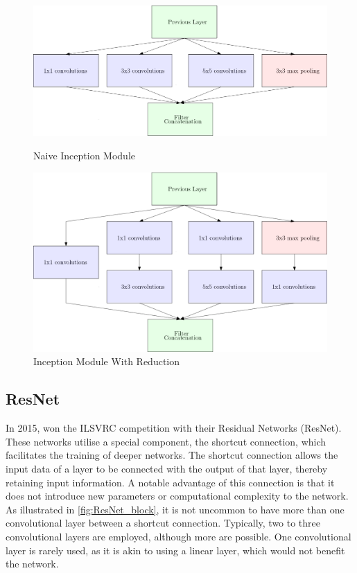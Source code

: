 \documentclass[
a4paper, 
12pt,
grayscalebody, %
abstract=on,
twoside, BCOR10mm, 12pt, DIV13,headinclude, footexclude, final, abstracton, openright
]{ibireprt}
\numberwithin{equation}{chapter}
\numberwithin{table}{chapter}
\numberwithin{figure}{chapter}
\numberwithin{algorithm}{chapter}
\numberwithin{example}{chapter}
\numberwithin{example}{chapter}
\begin{document}
\begin{figure}[h]	
	\centering
	\begin{minipage}[t]{.49\linewidth}
		\centering
		\includegraphics[width = \textwidth]{Inception_modle_naive.png}%
		\caption{Naive Inception Module}
		\label{fig:fig_max_pooling}
		
	\end{minipage}
	\hfill
	\begin{minipage}[t]{.49\linewidth}
		\centering
		\includegraphics[width = \textwidth]{Inception_modle_reduction.png}%
		\caption{Inception Module With Reduction}
		\label{fig:fig_max_pooling}
		
	\end{minipage}
\end{figure}%


\subsection{ResNet}
In 2015, \citet{He2016a}  won the ILSVRC competition with their Residual Networks (ResNet). These networks utilise a special component, the shortcut connection, which facilitates the training of deeper networks. The shortcut connection allows the input data of a layer to be connected with the output of that layer, thereby retaining input information. A notable advantage of this connection is that it does not introduce new parameters or computational complexity to the network. As illustrated in \ref{fig:ResNet_block}, it is not uncommon to have more than one convolutional layer between a shortcut connection. Typically, two to three convolutional layers are employed, although more are possible. One convolutional layer is rarely used, as it is akin to using a linear layer, which would not benefit the network.
\end{document}

